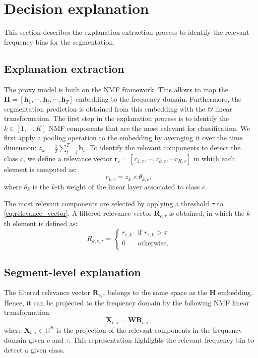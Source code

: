 \section{Decision explanation}
\label{sect:explain}
This section describes the explanation extraction process to identify the relevant frequency bins for the segmentation.

\subsection{Explanation extraction}

The proxy model is built on the NMF framework.
This allows to map the $\mathbf{H}=[\mathbf{h}_1,\cdots,\mathbf{h}_t,\cdots,\mathbf{h}_T]$ embedding to the frequency domain.
Furthermore, the segmentation prediction is obtained from this embedding with the $\Theta$ linear transformation.
The first step in the explanation process is to identify the $k\in [1,\cdots, K]$ NMF components that are the most relevant for classification.
We first apply a pooling operation to the embedding by averaging it over the time dimension: $z_k = \frac{1}{T}\sum_{t=1}^T \mathbf{h}_t$.
To identify the relevant components to detect the class $c$, we define a relevance vector $\mathbf{r}_c=[r_{1,c}, \cdots, r_{k,c}, \cdots r_{K,c}]$ in which each element is computed as:
\begin{equation}
    r_{k,c} = z_k \times \theta_{k,c},
    \label{eq:relevance_vector}
\end{equation}
where $\theta_{k}$ is the $k$-th weight of the linear layer associated to class $c$.

The most relevant components are selected by applying a threshold $\tau$ to \eqref{eq:relevance_vector}. 
A filtered relevance vector $\mathbf{R}_{c,\tau}$ is obtained, in which the $k$-th element is defined as:
\begin{equation}
    R_{k,c,\tau} = 
    \begin{cases}
        r_{r,k} & \text{if } r_{r,k} > \tau \\
        0       & \text{otherwise}. \\
    \end{cases}
\end{equation}

\subsection{Segment-level explanation}

The filtered relevance vector $\mathbf{R}_{c,\tau}$ belongs to the same space as the $\mathbf{H}$ embedding.
Hence, it can be projected to the frequency domain by the following NMF linear transformation:
\begin{equation}
    \mathbf{X}_{c,\tau} = \mathbf{W}\mathbf{R}_{c,\tau},
    \label{eq:rel_proj_freq}
\end{equation}
where $\mathbf{X}_{c,\tau}\in\mathbb{R}^{K}$ is the projection of the relevant components in the frequency domain given $c$ and $\tau$.
This representation highlights the relevant frequency bin to detect a given class.


